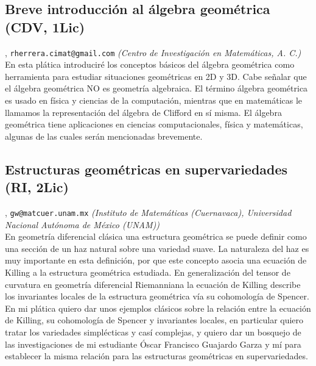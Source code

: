 \subsection{\sffamily Breve introducci\'on al \'algebra geom\'etrica {\footnotesize (CDV, 1Lic)}} \label{reg-379} 
, {\tt rherrera.cimat@gmail.com}  {\slshape (Centro de Investigaci\'on en Matem\'aticas, A. C.)}\\
          \noindent En esta pl\'atica introducir\'e los conceptos b\'asicos del \'algebra geom\'etrica como herramienta para estudiar situaciones geom\'etricas en 2D y 3D. Cabe se\~nalar que el \'algebra geom\'etrica NO es geometr\'ia algebraica. El t\'ermino \'algebra geom\'etrica es usado en f\'isica y ciencias de la computaci\'on, mientras que en matem\'aticas le llamamos la representaci\'on del \'algebra de Clifford en s\'i misma. El \'algebra geom\'etrica tiene aplicaciones en ciencias computacionales, f\'isica y matem\'aticas, algunas de las cuales ser\'an mencionadas brevemente.
\subsection{\sffamily Estructuras geom\'etricas en supervariedades {\footnotesize (RI, 2Lic)}} \label{reg-840} 
, {\tt gw@matcuer.unam.mx}  {\slshape (Instituto de Matem\'aticas (Cuernavaca), Universidad Nacional Aut\'onoma de M\'exico (UNAM))}\\
          \noindent En geometr\'ia diferencial cl\'asica una estructura geom\'etrica se puede definir como una secci\'on de un haz natural sobre una variedad suave. La naturaleza del haz es muy importante en esta definici\'on, por que este concepto asocia una ecuaci\'on de Killing a la estructura geom\'etrica estudiada. En generalizaci\'on del tensor de curvatura en geometr\'ia diferencial Riemanniana la ecuaci\'on de Killing describe los invariantes locales de la estructura geom\'etrica v\'ia su cohomolog\'ia de Spencer. En mi pl\'atica quiero dar unos ejemplos cl\'asicos sobre la relaci\'on entre la ecuaci\'on de Killing, su cohomolog\'ia de Spencer y invariantes locales, en particular quiero tratar los variedades simpl\'ecticas y cas\'i complejas, y quiero dar un bosquejo de las investigaciones de mi estudiante \'Oscar Francisco Guajardo Garza y m\'i para establecer la misma relaci\'on para las estructuras geom\'etricas en supervariedades.
